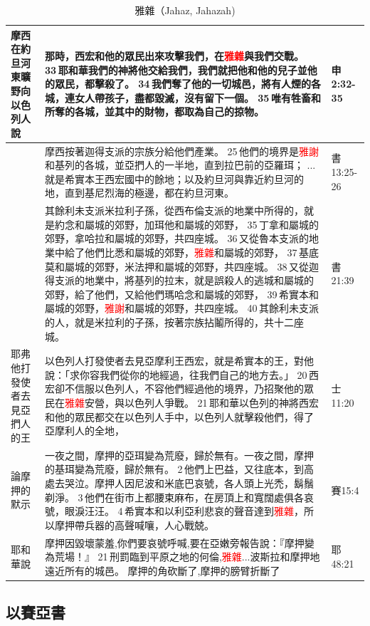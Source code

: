 \begin{table}[H]
\begin{tabular}{p{}|p{14cm}|p{}}
摩西在約旦河東曠野向以色列人說&那時，西宏和他的眾民出來攻擊我們，在\textcolor{red}{雅雜}與我們交戰。 33 耶和華我們的神將他交給我們，我們就把他和他的兒子並他的眾民，都擊殺了。 34 我們奪了他的一切城邑，將有人煙的各城，連女人帶孩子，盡都毀滅，沒有留下一個。 35 唯有牲畜和所奪的各城，並其中的財物，都取為自己的掠物。&申2:32-35\\\hline
&摩西按著迦得支派的宗族分給他們產業。 25 他們的境界是\textcolor{red}{雅謝}和基列的各城，並亞捫人的一半地，直到拉巴前的亞羅珥； ...就是希實本王西宏國中的餘地；以及約旦河與靠近約旦河的地，直到基尼烈海的極邊，都在約旦河東。&書13:25-26\\\hline
&其餘利未支派米拉利子孫，從西布倫支派的地業中所得的，就是約念和屬城的郊野，加珥他和屬城的郊野， 35 丁拿和屬城的郊野，拿哈拉和屬城的郊野，共四座城。 36 又從魯本支派的地業中給了他們比悉和屬城的郊野，\textcolor{red}{雅雜}和屬城的郊野， 37 基底莫和屬城的郊野，米法押和屬城的郊野，共四座城。 38 又從迦得支派的地業中，將基列的拉末，就是誤殺人的逃城和屬城的郊野，給了他們，又給他們瑪哈念和屬城的郊野， 39 希實本和屬城的郊野，\textcolor{red}{雅謝}和屬城的郊野，共四座城。 40 其餘利未支派的人，就是米拉利的子孫，按著宗族拈鬮所得的，共十二座城。&書21:39\\\hline
耶弗他打發使者去見亞捫人的王&以色列人打發使者去見亞摩利王西宏，就是希實本的王，對他說：「求你容我們從你的地經過，往我們自己的地方去。」 20 西宏卻不信服以色列人，不容他們經過他的境界，乃招聚他的眾民在\textcolor{red}{雅雜}安營，與以色列人爭戰。 21 耶和華以色列的神將西宏和他的眾民都交在以色列人手中，以色列人就擊殺他們，得了亞摩利人的全地，&士11:20\\\hline
論摩押的默示&一夜之間，摩押的亞珥變為荒廢，歸於無有。一夜之間，摩押的基珥變為荒廢，歸於無有。 2 他們上巴益，又往底本，到高處去哭泣。摩押人因尼波和米底巴哀號，各人頭上光禿，鬍鬚剃淨。 3 他們在街市上都腰束麻布，在房頂上和寬闊處俱各哀號，眼淚汪汪。 4 希實本和以利亞利悲哀的聲音達到\textcolor{red}{雅雜}，所以摩押帶兵器的高聲喊嚷，人心戰兢。&賽15:4\\\hline
耶和華說&摩押因毀壞蒙羞,你們要哀號呼喊,要在亞嫩旁報告說：『摩押變為荒場！』 21 刑罰臨到平原之地的何倫,\textcolor{red}{雅雜}...波斯拉和摩押地遠近所有的城邑。 摩押的角砍斷了,摩押的膀臂折斷了&耶48:21\\\hline
\end{tabular}
\caption{雅雜（Jahaz, Jahazah)}
\end{table}







\subsection{以賽亞書}
